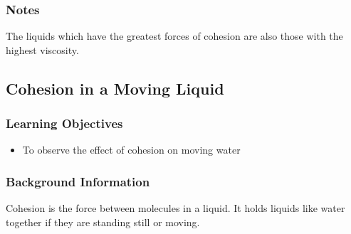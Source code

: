 \subsubsection*{Notes}
The liquids which have the greatest forces of cohesion are also those with the highest viscosity.




\subsection{Cohesion in a Moving Liquid}

\subsubsection*{Learning Objectives}
\begin{itemize}
\item{To observe the effect of cohesion on moving water}
\end{itemize}

\subsubsection*{Background Information}
Cohesion is the force between molecules in a liquid. It holds liquids like water together if they are standing still or moving.

